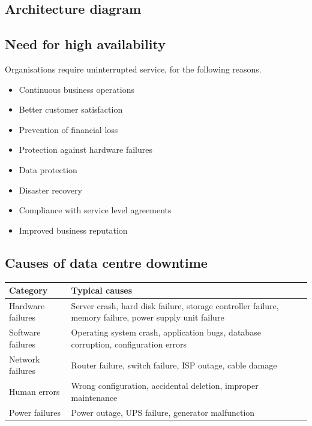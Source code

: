 \documentclass[11pt,a4paper]{article}
\begin{document}


\subsection{Architecture diagram}

\subsection{Need for high availability}

Organisations require uninterrupted service, for the following reasons.

\begin{itemize}\itemsep2pt
  \item Continuous business operations
  \item Better customer satisfaction
  \item Prevention of financial loss
  \item Protection against hardware failures
  \item Data protection
  \item Disaster recovery
  \item Compliance with service level agreements
  \item Improved business reputation
\end{itemize}

\subsection{Causes of data centre downtime}

\begin{tabularx}{\textwidth}{@{}lX@{}}
\toprule
\rowcolor{tablehead}\textbf{Category} & \textbf{Typical causes} \\
\midrule
Hardware failures & Server crash, hard disk failure, storage controller failure, memory
failure, power supply unit failure \\
\addlinespace
Software failures & Operating system crash, application bugs, database corruption,
configuration errors \\
\addlinespace
Network failures & Router failure, switch failure, ISP outage, cable damage \\
\addlinespace
Human errors & Wrong configuration, accidental deletion, improper maintenance \\
\addlinespace
Power failures & Power outage, UPS failure, generator malfunction \\
\bottomrule
\end{tabularx}
\end{document}
